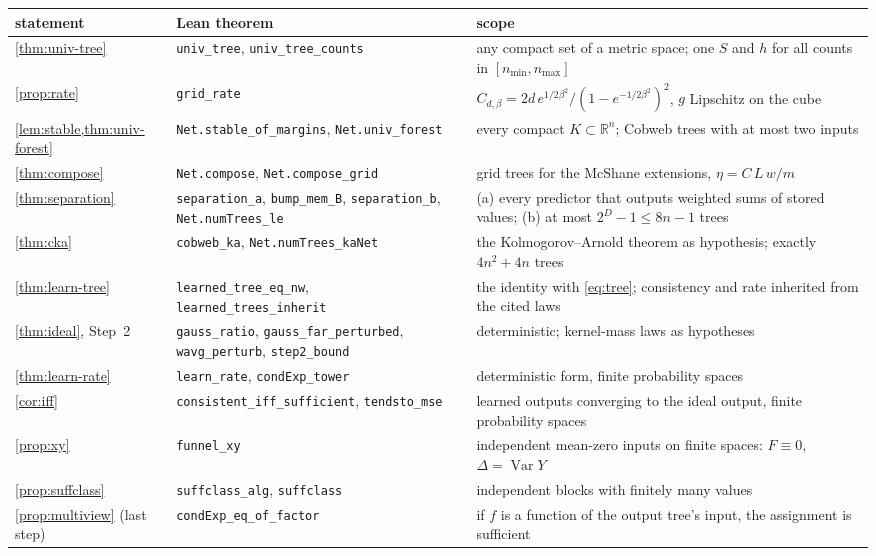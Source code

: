 \documentclass[11pt]{article}
\theoremstyle{definition}
\theoremstyle{remark}
\newcommand{\R}{\mathbb{R}}
\newcommand{\Var}{\operatorname{Var}}
\begin{document}
\begin{center}\small
\begin{tabular}{@{}p{3.3cm}p{5.4cm}p{6.4cm}@{}}\toprule
statement & Lean theorem & scope\\\midrule
\cref{thm:univ-tree} & \texttt{univ\_tree}, \texttt{univ\_tree\_counts} & any compact set of a metric space; one $S$ and $h$ for all counts in $[n_{\min},n_{\max}]$\\
\cref{prop:rate} & \texttt{grid\_rate} & $C_{d,\beta}=2d\,e^{1/2\beta^2}/(1-e^{-1/2\beta^2})^2$, $g$ Lipschitz on the cube\\
\cref{lem:stable,thm:univ-forest} & \texttt{Net.stable\_of\_margins}, \texttt{Net.univ\_forest} & every compact $K\subset\R^n$; Cobweb trees with at most two inputs\\
\cref{thm:compose} & \texttt{Net.compose}, \texttt{Net.compose\_grid} & grid trees for the McShane extensions, $\eta=C\,L\,w/m$\\
\cref{thm:separation} & \texttt{separation\_a}, \texttt{bump\_mem\_B}, \texttt{separation\_b}, \texttt{Net.numTrees\_le} & (a) every predictor that outputs weighted sums of stored values; (b) at most $2^D-1\le8n-1$ trees\\
\cref{thm:cka} & \texttt{cobweb\_ka}, \texttt{Net.numTrees\_kaNet} & the Kolmogorov--Arnold theorem as hypothesis; exactly $4n^2+4n$ trees\\
\cref{thm:learn-tree} & \texttt{learned\_tree\_eq\_nw}, \texttt{learned\_trees\_inherit} & the identity with \eqref{eq:tree}; consistency and rate inherited from the cited laws\\
\cref{thm:ideal}, Step~2 & \texttt{gauss\_ratio}, \texttt{gauss\_far\_perturbed}, \texttt{wavg\_perturb}, \texttt{step2\_bound} & deterministic; kernel-mass laws as hypotheses\\
\cref{thm:learn-rate} & \texttt{learn\_rate}, \texttt{condExp\_tower} & deterministic form, finite probability spaces\\
\cref{cor:iff} & \texttt{consistent\_iff\_sufficient}, \texttt{tendsto\_mse} & learned outputs converging to the ideal output, finite probability spaces\\
\cref{prop:xy} & \texttt{funnel\_xy} & independent mean-zero inputs on finite spaces: $F\equiv0$, $\Delta=\Var Y$\\
\cref{prop:suffclass} & \texttt{suffclass\_alg}, \texttt{suffclass} & independent blocks with finitely many values\\
\cref{prop:multiview} (last step) & \texttt{condExp\_eq\_of\_factor} & if $f$ is a function of the output tree's input, the assignment is sufficient\\

\end{tabular}
\end{center}
\end{document}
